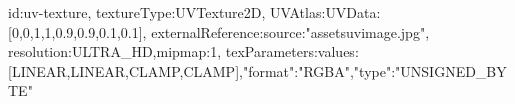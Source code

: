{id:uv-texture,
textureType:UVTexture2D,
UVAtlas:{UVData:[0,0,1,1,0.9,0.9,0.1,0.1]},
externalReference:{source:"assets\/uvimage.jpg"},
resolution:ULTRA_HD,mipmap:1,
texParameters:{values:[LINEAR,LINEAR,CLAMP,CLAMP]},"format":"RGBA","type":"UNSIGNED_BYTE"}